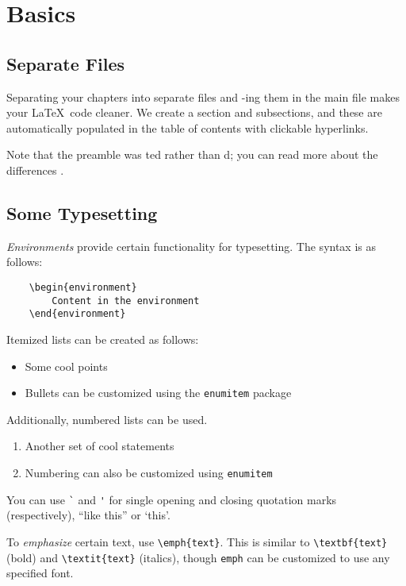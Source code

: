 \section{Basics}

\subsection{Separate Files}

Separating your chapters into separate files and \verb||-ing them in the main file makes your \LaTeX\ code
cleaner. We create a section and subsections, and these are automatically populated in the table of contents with
clickable hyperlinks.

Note that the preamble was \verb||ted rather than \verb||d; you can read more about the differences
\href{https://tex.stackexchange.com/questions/246/when-should-i-use-input-vs-include}{\color{blue}{here}}.

\subsection{Some Typesetting}

\emph{Environments} provide certain functionality for typesetting. The syntax is as follows:

\begin{verbatim}
    \begin{environment}
        Content in the environment
    \end{environment}
\end{verbatim}

Itemized lists can be created as follows:

\begin{itemize}
    \item Some cool points
    \item Bullets can be customized using the \verb|enumitem| package
\end{itemize}

Additionally, numbered lists can be used.

\begin{enumerate}
    \item Another set of cool statements
    \item Numbering can also be customized using \verb|enumitem|
\end{enumerate}

You can use \verb|`| and \verb|'| for single opening and closing quotation marks (respectively), ``like this'' or
`this'.

To \emph{emphasize} certain text, use \verb|\emph{text}|. This is similar to \verb|\textbf{text}| (bold) and
\verb|\textit{text}| (italics), though \verb|emph| can be customized to use any specified font.

